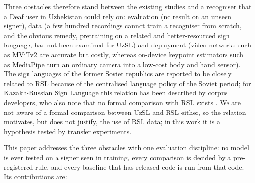 Three obstacles therefore stand between the existing studies and a recogniser that a Deaf user in Uzbekistan could rely on: evaluation (no result on an unseen signer), data (a few hundred recordings cannot train a recogniser from scratch, and the obvious remedy, pretraining on a related and better-resourced sign language, has not been examined for UzSL) and deployment (video networks such as MViTv2 \citep{2022_li_mvitv2} are accurate but costly, whereas on-device keypoint estimators such as MediaPipe \citep{2020_zhang_mediapipe_hands, docs_mediapipe_holistic_landmarker} turn an ordinary camera into a low-cost body and hand sensor). The sign languages of the former Soviet republics are reported to be closely related to RSL because of the centralised language policy of the Soviet period; for Kazakh-Russian Sign Language this relation has been described by corpus developers, who also note that no formal comparison with RSL exists \citep{2020_imashev_krsl_dataset, 2024_imashev_krsl_retrospective}. We are not aware of a formal comparison between UzSL and RSL either, so the relation motivates, but does not justify, the use of RSL data; in this work it is a hypothesis tested by transfer experiments.

This paper addresses the three obstacles with one evaluation discipline: no model is ever tested on a signer seen in training, every comparison is decided by a pre-registered rule, and every baseline that has released code is run from that code. Its contributions are:

